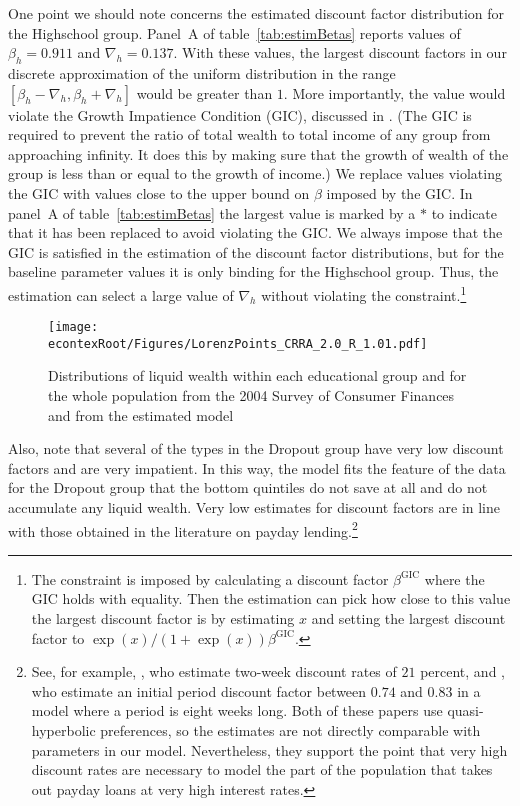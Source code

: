 \documentclass[\econtexRoot/HAFiscal]{subfiles}
\begin{document}
One point we should note concerns the estimated discount factor distribution for the Highschool group.
Panel~A of table~\ref{tab:estimBetas} reports values of $\beta_h=0.911$ and $\nabla_h=0.137$.
With these values, the largest discount factors in our discrete approximation of the uniform distribution in the range $[\beta_h-\nabla_h, \beta_h+\nabla_h]$ would be greater than $1$.
More importantly, the value would violate the Growth Impatience Condition (GIC), discussed in \cite{carroll2022theoretical}.
(The GIC is required to prevent the ratio of total wealth to total income of any group from approaching infinity.
It does this by making sure that the growth of wealth of the group is less than or equal to the growth of income.)
We replace values violating the GIC with values close to the upper bound on $\beta$ imposed by the GIC.
In panel~A of table~\ref{tab:estimBetas} the largest value is marked by a $*$ to indicate that it has been replaced to avoid violating the GIC.
We always impose that the GIC is satisfied in the estimation of the discount factor distributions, but for the baseline parameter values it is only binding for the Highschool group.
Thus, the estimation can select a large value of $\nabla_h$ without violating the constraint.\footnote{The constraint is imposed by calculating a discount factor $\beta^{\text{GIC}}$ where the GIC holds with equality.
Then the estimation can pick how close to this value the largest discount factor is by estimating $x$ and setting the largest discount factor to $\exp(x)/(1+\exp(x)) \beta^{\text{GIC}}$.} 

\begin{figure}[th]
  \begin{center}
    \texttt{[image: \\econtexRoot/Figures/LorenzPoints\_CRRA\_2.0\_R\_1.01.pdf]}
    \caption{Distributions of liquid wealth within each educational group and for the whole population from the 2004 Survey of Consumer Finances and from the estimated model}
    \notinsubfile{\label{fig:LorenzPts}}
  \end{center}
\end{figure}

Also, note that several of the types in the Dropout group have very low discount factors and are very impatient.
In this way, the model fits the feature of the data for the Dropout group that the bottom quintiles do not save at all and do not accumulate any liquid wealth.
Very low estimates for discount factors are in line with those obtained in the literature on payday lending.\footnote{See, for example, \cite{skiba2008payday}, who estimate two-week discount rates of $21$ percent, and \cite{allcott2021high}, who estimate an initial period discount factor between $0.74$ and $0.83$ in a model where a period is eight weeks long.
Both of these papers use quasi-hyperbolic preferences, so the estimates are not directly comparable with parameters in our model.
Nevertheless, they support the point that very high discount rates are necessary to model the part of the population that takes out payday loans at very high interest rates.} 
\end{document}

